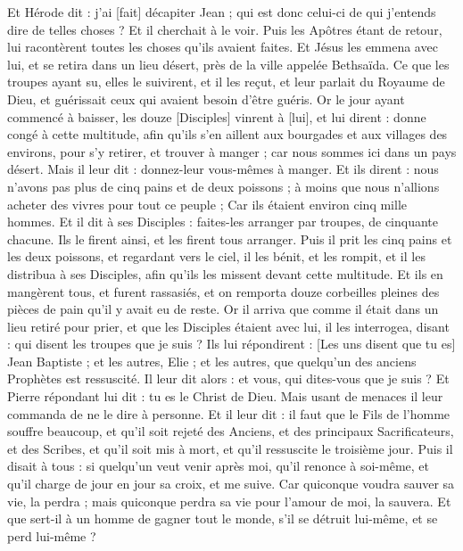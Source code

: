 \begin{multicols}{2}
Et Hérode dit : j'ai [fait] décapiter Jean ; qui est donc celui-ci de qui j'entends dire de telles choses ? Et il cherchait à le voir.
Puis les Apôtres étant de retour, lui racontèrent toutes les choses qu'ils avaient faites. Et Jésus les emmena avec lui, et se retira dans un lieu désert, près de la ville appelée Bethsaïda.
Ce que les troupes ayant su, elles le suivirent, et il les reçut, et leur parlait du Royaume de Dieu, et guérissait ceux qui avaient besoin d'être guéris.
Or le jour ayant commencé à baisser, les douze [Disciples] vinrent à [lui], et lui dirent : donne congé à cette multitude, afin qu'ils s'en aillent aux bourgades et aux villages des environs, pour s'y retirer, et trouver à manger ; car nous sommes ici dans un pays désert.
Mais il leur dit : donnez-leur vous-mêmes à manger. Et ils dirent : nous n'avons pas plus de cinq pains et de deux poissons ; à moins que nous n'allions acheter des vivres pour tout ce peuple ;
Car ils étaient environ cinq mille hommes. Et il dit à ses Disciples : faites-les arranger par troupes, de cinquante chacune.
Ils le firent ainsi, et les firent tous arranger.
Puis il prit les cinq pains et les deux poissons, et regardant vers le ciel, il les bénit, et les rompit, et il les distribua à ses Disciples, afin qu'ils les missent devant cette multitude.
Et ils en mangèrent tous, et furent rassasiés, et on remporta douze corbeilles pleines des pièces de pain qu'il y avait eu de reste.
Or il arriva que comme il était dans un lieu retiré pour prier, et que les Disciples étaient avec lui, il les interrogea, disant : qui disent les troupes que je suis ?
Ils lui répondirent : [Les uns disent que tu es] Jean Baptiste ; et les autres, Elie ; et les autres, que quelqu'un des anciens Prophètes est ressuscité.
Il leur dit alors : et vous, qui dites-vous que je suis ? Et Pierre répondant lui dit : tu es le Christ de Dieu.
Mais usant de menaces il leur commanda de ne le dire à personne.
Et il leur dit : il faut que le Fils de l'homme souffre beaucoup, et qu'il soit rejeté des Anciens, et des principaux Sacrificateurs, et des Scribes, et qu'il soit mis à mort, et qu'il ressuscite le troisième jour.
Puis il disait à tous : si quelqu'un veut venir après moi, qu'il renonce à soi-même, et qu'il charge de jour en jour sa croix, et me suive.
Car quiconque voudra sauver sa vie, la perdra ; mais quiconque perdra sa vie pour l'amour de moi, la sauvera.
Et que sert-il à un homme de gagner tout le monde, s'il se détruit lui-même, et se perd lui-même ?

\end{multicols}
